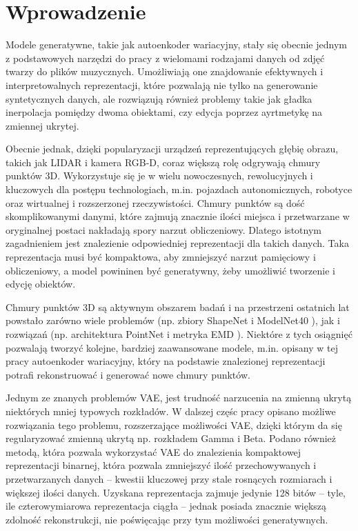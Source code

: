 \documentclass{iithesis}
\author         {Jakub Zadrożny}
\date           {6 września 2019}
\begin{document}
\chapter{Wprowadzenie}
Modele generatywne, takie jak autoenkoder wariacyjny, stały się obecnie jednym z podstawowych narzędzi
do pracy z wielomami rodzajami danych od zdjęć twarzy do plików muzycznych.
Umożliwiają one znajdowanie efektywnych i interpretowalnych reprezentacji, które
pozwalają nie tylko na generowanie syntetycznych danych, ale rozwiązują również problemy takie
jak gładka inerpolacja pomiędzy dwoma obiektami, czy edycja poprzez ayrtmetykę na zmiennej ukrytej.

Obecnie jednak, dzięki popularyzacji urządzeń reprezentujących głębię obrazu,
takich jak LIDAR i kamera RGB-D, coraz większą rolę odgrywają chmury punktów 3D.
Wykorzystuje się je w wielu nowoczesnych, rewolucyjnych i kluczowych dla postępu technologiach,
m.in. pojazdach autonomicznych, robotyce oraz wirtualnej i rozszerzonej rzeczywistości.
Chmury punktów są dość skomplikowanymi danymi, które zajmują znacznie ilości miejsca i przetwarzane
w oryginalnej postaci nakładają spory narzut obliczeniowy. Dlatego istotnym zagadnieniem
jest znalezienie odpowiedniej reprezentacji dla takich danych. Taka reprezentacja
musi być kompaktowa, aby zmniejszyć narzut pamięciowy i obliczeniowy, a model powininen być generatywny,
żeby umożliwić tworzenie i edycję obiektów.

Chmury punktów 3D są aktywnym obszarem badań i na przestrzeni ostatnich lat powstało zarówno
wiele problemów (np. zbiory ShapeNet \cite{shapenet} i ModelNet40 \cite{modelnet}), jak i
rozwiązań (np. architektura PointNet \cite{pointnet} i metryka EMD \cite{emd}).
Niektóre z tych osiągnięć pozwalają tworzyć kolejne, bardziej zaawansowane modele,
m.in. opisany w tej pracy autoenkoder wariacyjny, który na podstawie znalezionej reprezentacji
potrafi rekonstruować i generować nowe chmury punktów.

Jednym ze znanych problemów VAE, jest trudność narzucenia na zmienną ukrytą niektórych mniej typowych rozkładów.
W dalszej częśc pracy opisano możliwe rozwiązania tego problemu, rozszerzające możliwości VAE,
dzięki którym da się regularyzować zmienną ukrytą np. rozkładem Gamma i Beta.
Podano również metodą, która pozwala wykorzystać VAE do znalezienia kompaktowej reprezentacji binarnej, która
pozwala zmniejszyć ilość przechowywanych i przetwarzanych danych -- kwestii kluczowej przy
stale rosnących rozmiarach i większej ilości danych.
Uzyskana reprezentacja zajmuje jedynie 128 bitów -- tyle, ile czterowymiarowa
reprezentacja ciągła -- jednak posiada znacznie większą zdolność rekonstrukcji, nie poświęcając
przy tym możliwości generatywnych.
\end{document}
